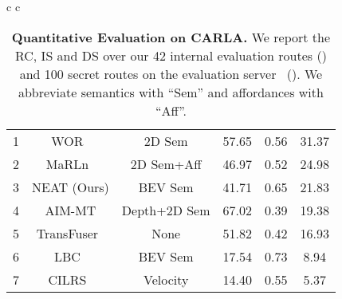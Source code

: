 \begin{table*}[t]
\begin{tabular}{c c}
\begin{subtable}[h]{0.40\textwidth}
\begin{tabular}{c | c | c | c c c}
        		\hline
        		1 & WOR~\cite{Chen2021ARXIV} & 2D Sem & 57.65 & 0.56 & 31.37 \\
        		2 & MaRLn~\cite{Toromanoff2020CVPR} & 2D Sem+Aff & 46.97 & 0.52 & 24.98 \\
        		3 & NEAT (Ours) & BEV Sem & 41.71 & 0.65 & 21.83 \\
        		4 & AIM-MT & Depth+2D Sem & 67.02 & 0.39 & 19.38 \\
        		5 & TransFuser~\cite{Prakash2021CVPR} & None & 51.82 & 0.42 & 16.93 \\
        		6 & LBC~\cite{Chen2019CORL} & BEV Sem & 17.54 & 0.73 & 8.94 \\
        		7 & CILRS~\cite{Codevilla2019ICCV}& Velocity & 14.40 & 0.55 & 5.37 \\
        	\end{tabular}
        	\caption{\textbf{CARLA Leaderboard.} Among all publicly visible entries (accessed in July 2021), NEAT obtains the third-best DS. Of the top 3 methods, NEAT has the highest IS, indicating safer driving on unseen routes.}
        	\label{tab:challenge}
        	\vspace{0.0cm}
        \end{subtable}
    \end{tabular}
    \vspace{-0.2cm}
    \caption{\textbf{Quantitative Evaluation on CARLA.} We report the RC, IS and DS over our 42 internal evaluation routes () and 100 secret routes on the evaluation server~\cite{Leaderboard} (). We abbreviate semantics with ``Sem'' and affordances with ``Aff''.}
    \label{tab:results}
    \vspace{-0.3cm}
\end{table*}

